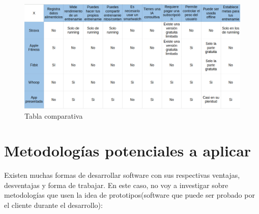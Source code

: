 \begin{landscape}
\begin{figure}[H]
   \centering
    \includegraphics[width=1.65\textwidth]{tablas/tabla.png}
    \caption{Tabla comparativa}
    \label{fig:Tabla comparativa}
\end{figure} 
\end{landscape}

\section{Metodologías potenciales a aplicar}

Existen muchas formas de desarrollar software con sus respectivas ventajas, desventajas y forma de trabajar. En este caso, no voy a investigar sobre metodologías que usen la idea de prototipos(software que puede ser probado por el cliente durante el desarrollo):

